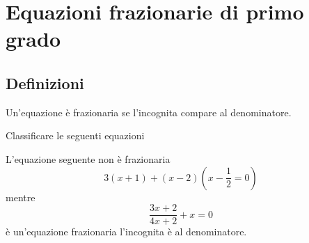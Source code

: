 \chapter{Equazioni frazionarie di primo grado}
\label{cha:Equazionefrazionariaprimogrado}
\section{Definizioni}
\label{sec:definizioni}
\begin{definizionet}{}{}
Un'equazione è frazionaria se l'incognita compare al denominatore.
\end{definizionet}
\begin{esempiot}
Classificare le seguenti equazioni
\end{esempiot}
L'equazione seguente non è frazionaria
\[3(x+1)+(x-2)(x-\dfrac{1}{2}=0) \]
mentre
\[\dfrac{3x+2}{4x+2}+x=0 \]
è un'equazione frazionaria l'incognita è al denominatore.

